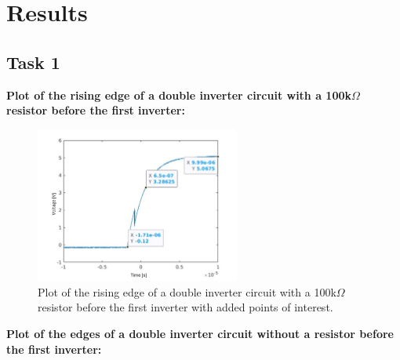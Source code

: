 \documentclass[onecolumn]{article}
\begin{document}
\clearpage

\section{Results}
\subsection{Task 1}
\textbf{Plot of the rising edge of a double inverter circuit with a 100k$\Omega$ resistor before the first inverter:}
\begin{figure}[h!]
  \centering
  \includegraphics[width=0.6\textwidth]{plot1.png}
  \caption{Plot of the rising edge of a double inverter circuit with a 100k$\Omega$ resistor before the first inverter with added points of interest.}
  \label{fig:plot}
\end{figure}

\textbf{Plot of the edges of a double inverter circuit without a resistor before the first inverter:}
\end{document}
